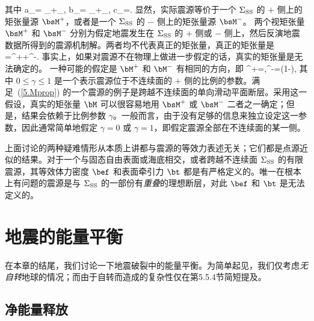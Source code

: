 \en
其中
\eq
a_{\pm}=\frac{(\kappa_{\pm}-\twothirds\mu_{\pm})
-(\kappa_{\mp}-\twothirds\mu_{\mp})}
{\kappa_{\mp}+\fourthirds\mu_{\mp}},
\en
\eq
b_{\pm}=\frac{\kappa_{\pm}+\fourthirds\mu_{\pm}}
{\kappa_{\mp}+\fourthirds\mu_{\mp}}, \qquad
c_{\pm}=\frac{\mu_{\pm}}{\mu_{\mp}}.
\en
显然，实际震源等价于一个 $\Sigma_{\rm SS}$ 的 $+$ 侧上的矩张量源 $\bsM^+$，或者是一个 $\Sigma_{\rm SS}$ 的 $-$ 侧上的矩张量源 $\bsM^-$。
两个视矩张量 $\bsM^+$ 和 $\bsM^-$ 分别为假定地震发生在 $\Sigma_{\rm SS}$ 的 $+$ 侧或 $-$ 侧上，然后反演地震数据所得到的震源机制解。两者均不代表真正的矩张量，真正的矩张量是
\eq
\bM=\bM^++\bM^-.
\en
事实上，如果对震源不在物理上做进一步假定的话，真实的矩张量是无法确定的。
一种可能的假定是 $\bM^+$ 和 $\bM^-$ 有相同的方向，即
\eq
\label{5.Mprop}
\bM^+=\gamma\bM,\qquad\bM^-=(1-\gamma)\bM,
\en
其中 $0\leq\gamma\leq 1$ 是一个表示震源位于不连续面的 $+$ 侧的比例的参数。满足~(\ref{5.Mprop}) 的一个震源的例子是跨越不连续面的单向滑动平面断层。采用这一假设，真实的矩张量 $\bM$ 可以很容易地用 $\bsM^+$ 或 $\bsM^-$ 二者之一确定；但是，结果会依赖于比例参数 $\gamma$。一般而言，由于没有足够的信息来独立设定这一参数，因此通常简单地假定 $\gamma=0$ 或 $\gamma=1$，即假定震源全部在不连续面的某一侧。

上面讨论的两种疑难情形从本质上讲都与震源的等效力表述无关；它们都是点源近似的结果。对于一个与固态自由表面或海底相交，或者跨越不连续面 $\Sigma_{\rm SS}$ 的有限震源，其等效体力密度 $\bef$ 和表面牵引力 $\bt$ 都是有严格定义的。唯一在根本上有问题的震源是与 $\Sigma_{\rm SS}$ 的一部份有{\em 重叠\/}的理想断层，对此 $\bef$ 和 $\bt$ 是无法定义的。
%
%

\renewcommand{\thesection}{$\!\!\!\raise1.3ex\hbox{$\star$}\!\!$
\arabic{chapter}.\arabic{section}}
\section{地震的能量平衡}
%
%
\label{5.sec.energy}
\renewcommand{\thesection}{\arabic{chapter}.\arabic{section}}

在本章的结尾，我们讨论一下地震破裂中的能量平衡。为简单起见，我们仅考虑{\em 无自转\/}地球的情况；而由于自转而造成的复杂性仅在第5.5.4节简短提及。

\renewcommand{\thesubsection}{$\!\!\!\raise1.3ex\hbox{$\star$}\!\!$
\arabic{chapter}.\arabic{section}.\arabic{subsection}}
\subsection{净能量释放}
%
\label{5.sec.release}
\renewcommand{\thesubsection}{\arabic{chapter}.\arabic{section}.\arabic{subsection}}

